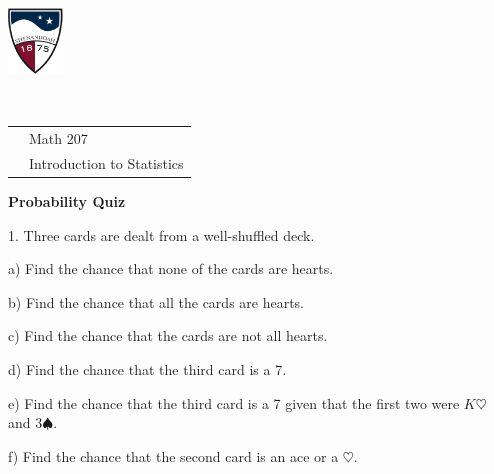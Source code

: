 \documentclass[10pt]{article}
\begin{document}
\newcommand{\ticket}[2]{\psframe(0,0)(0.5,0.5)\psframe(0.5,0)(1,0.5)\rput(0.25,0.25){#1}\rput(0.75,0.25){#2}}
\pagestyle{empty}
\lstset{language=R, showspaces=false, showstringspaces=false}


\pagestyle{empty}
\lstset{language=R, showspaces=false, showstringspaces=false}

\href{http://www.su.edu}{\includegraphics[height=1.75cm]{sulogo.eps}}
\vspace{-1.79cm}

{{\ }\hfill \small
\begin{tabular}{cl}
& Math 207\\
& Introduction to Statistics\\
\end{tabular}
}
\setlength{\baselineskip}{1.05\baselineskip}

\begin{center}
\textbf{\large  Probability Quiz}
\end{center}

1. Three cards are dealt from a well-shuffled deck.
\smallskip

\hspace{20pt} a) Find the chance that none of the cards are hearts.
\vspace{0.75in}

\hspace{20pt} b) Find the chance that all the cards are hearts.
\vspace{0.75in}

\hspace{20pt} c) Find the chance that the cards are not all hearts.
\vspace{0.75in}

\hspace{20pt} d) Find the chance that the third card is a 7.
\vspace{0.75in}

\hspace{20pt} e) Find the chance that the third card is a 7 given that the first two 
were $K\heartsuit$ and $3\spadesuit$.
\vspace{0.75in}

\hspace{20pt} f) Find the chance that the second card is an ace or a $\heartsuit$.
\vspace{0.75in}
\end{document}
